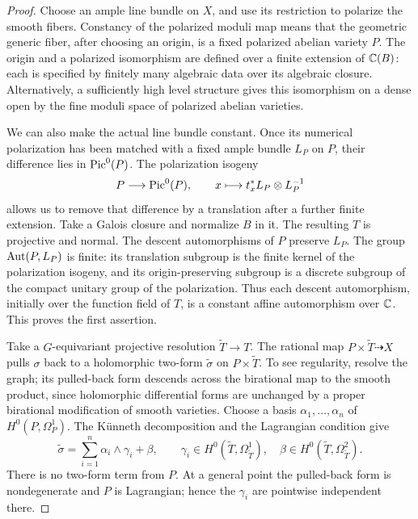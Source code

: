 \begin{proof}
Choose an ample line bundle on \(X\), and use its restriction to polarize
the smooth fibers.  Constancy of the polarized moduli map means that
the geometric generic fiber, after choosing an origin, is a fixed
polarized abelian variety \(P\).
The origin and a polarized isomorphism are defined over a finite
extension of \(\mathbb C(B)\): each is specified by finitely many algebraic
data over its algebraic closure.  Alternatively, a sufficiently high
level structure gives this isomorphism on a dense open by the fine
moduli space of polarized abelian varieties.

We can also make the actual line bundle constant.  Once its numerical
polarization has been matched with a fixed ample bundle \(L_P\) on
\(P\), their difference lies in \(\operatorname{Pic}^0(P)\).
The polarization isogeny
\[
 P\longrightarrow\operatorname{Pic}^0(P),\qquad
 x\longmapsto t_x^*L_P\otimes L_P^{-1}
\]
allows us to remove that difference by a translation after a further
finite extension.  Take a Galois closure and normalize \(B\) in it.
The resulting \(T\) is projective and normal.
The descent automorphisms of \(P\) preserve \(L_P\).
The group \(\operatorname{Aut}(P,L_P)\) is finite: its translation subgroup is the
finite kernel of the polarization isogeny, and its origin-preserving
subgroup is a discrete subgroup of the compact unitary group of the
polarization.  Thus each descent automorphism, initially over the
function field of \(T\), is a constant affine automorphism over \(\mathbb C\).
This proves the first assertion.

Take a \(G\)-equivariant projective resolution
\(\widetilde T\to T\).
The rational map \(P\times\widetilde T\dashrightarrow X\) pulls
\(\sigma\) back to a holomorphic two-form \(\widetilde\sigma\) on
\(P\times\widetilde T\).  To see regularity, resolve the graph; its
pulled-back form descends across the birational map to the smooth
product, since holomorphic differential forms are unchanged by a
proper birational modification of smooth varieties.
Choose a basis \(\alpha_1,\ldots,\alpha_n\) of \(H^0(P,\Omega_P^1)\).
The K\"unneth decomposition and the Lagrangian condition give
\begin{equation}\label{iso:cross-term}
 \widetilde\sigma
    =\sum_{i=1}^n\alpha_i\wedge\gamma_i+\beta,
 \qquad
 \gamma_i\in H^0(\widetilde T,\Omega_{\widetilde T}^1),\quad
 \beta\in H^0(\widetilde T,\Omega_{\widetilde T}^2).
\end{equation}
There is no two-form term from \(P\).
At a general point the pulled-back form is nondegenerate and \(P\)
is Lagrangian; hence the \(\gamma_i\) are pointwise independent there.


\end{proof}
